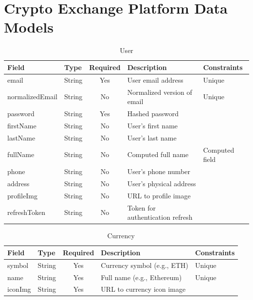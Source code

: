 \section{Crypto Exchange Platform Data Models}
\begin{table}[htbp]
  \centering
  \caption{User}
  \footnotesize
  \renewcommand{\arraystretch}{1.4}
  \setlength{\tabcolsep}{6pt}
  \begin{tabular}{|l|l|c|p{4cm}|p{2.8cm}|}
    \hline
    \textbf{Field} & \textbf{Type} & \textbf{Required} & \textbf{Description} & \textbf{Constraints} \\
    \hline
    email & String & Yes & User email address & Unique \\
    \hline
    normalizedEmail & String & No & Normalized version of email & Unique \\
    \hline
    password & String & Yes & Hashed password & \\
    \hline
    firstName & String & No & User's first name & \\
    \hline
    lastName & String & No & User's last name & \\
    \hline
    fullName & String & No & Computed full name & Computed field \\
    \hline
    phone & String & No & User's phone number & \\
    \hline
    address & String & No & User's physical address & \\
    \hline
    profileImg & String & No & URL to profile image & \\
    \hline
    refreshToken & String & No & Token for authentication refresh & \\
    \hline
  \end{tabular}
\end{table}

\begin{table}[htbp]
  \centering
  \caption{Currency}
  \footnotesize
  \renewcommand{\arraystretch}{1.1}
  \setlength{\tabcolsep}{6pt}
  \begin{tabular}{|l|l|c|p{4cm}|p{2.8cm}|}
    \hline
    \textbf{Field} & \textbf{Type} & \textbf{Required} & \textbf{Description} & \textbf{Constraints} \\
    \hline
    symbol & String & Yes & Currency symbol (e.g., ETH) & Unique \\
    \hline
    name & String & Yes & Full name (e.g., Ethereum) & Unique \\
    \hline
    iconImg & String & Yes & URL to currency icon image & \\
    \hline
  \end{tabular}
\end{table}

